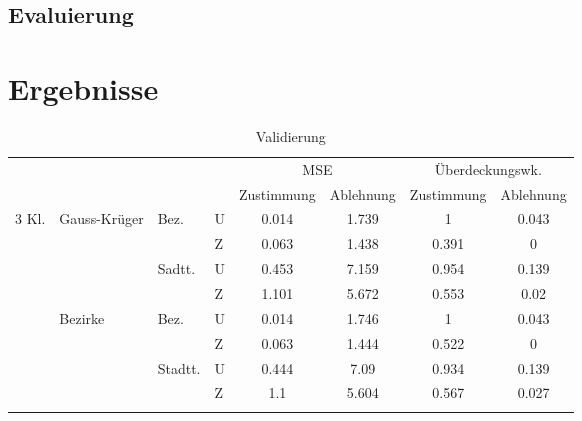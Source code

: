 \documentclass{Vorlage}
\begin{document}
\subsection{Evaluierung}

\section{Ergebnisse}

\begin{table}[h]
\centering
\caption{Validierung}
\label{vali}
\begin{tabular}{llll|cc|cc}
\hline \hline
                        &                               &                          &   & \multicolumn{2}{c|}{MSE} & \multicolumn{2}{c}{Überdeckungswk.} \\
                        &                               &                          &   & Zustimmung  & Ablehnung  & Zustimmung        & Ablehnung       \\ \hline
\multirow{12}{*}{3 Kl.} & \multirow{4}{*}{Gauss-Krüger} & \multirow{2}{*}{Bez.}    & U & 0.014       & 1.739      & 1                 & 0.043           \\
                        &                               &                          & Z & 0.063       & 1.438      & 0.391             & 0               \\ \cline{3-8} 
                        &                               & \multirow{2}{*}{Sadtt.}  & U & 0.453       & 7.159      & 0.954             & 0.139           \\
                        &                               &                          & Z & 1.101       & 5.672      & 0.553             & 0.02            \\ \cline{2-8} 
                        & \multirow{4}{*}{Bezirke}      & \multirow{2}{*}{Bez.}    & U & 0.014       & 1.746      & 1                 & 0.043           \\
                        &                               &                          & Z & 0.063       & 1.444      & 0.522             & 0               \\ \cline{3-8} 
                        &                               & \multirow{2}{*}{Stadtt.} & U & 0.444       & 7.09       & 0.934             & 0.139           \\
                        &                               &                          & Z & 1.1         & 5.604      & 0.567             & 0.027           \\ \cline{2-8} 

\end{tabular}
\end{table}
\end{document}
